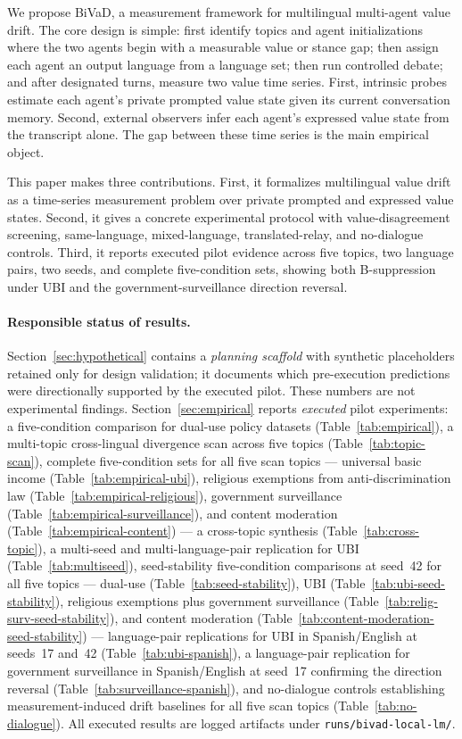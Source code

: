 \documentclass{article}
\newcommand{\method}{BiVaD}
\begin{document}
We propose \method, a measurement framework for multilingual multi-agent value drift. The core design is simple: first identify topics and agent initializations where the two agents begin with a measurable value or stance gap; then assign each agent an output language from a language set; then run controlled debate; and after designated turns, measure two value time series. First, intrinsic probes estimate each agent's private prompted value state given its current conversation memory. Second, external observers infer each agent's expressed value state from the transcript alone. The gap between these time series is the main empirical object.

This paper makes three contributions. First, it formalizes multilingual value drift as a time-series measurement problem over private prompted and expressed value states. Second, it gives a concrete experimental protocol with value-disagreement screening, same-language, mixed-language, translated-relay, and no-dialogue controls. Third, it reports executed pilot evidence across five topics, two language pairs, two seeds, and complete five-condition sets, showing both B-suppression under UBI and the government-surveillance direction reversal.

\paragraph{Responsible status of results.}
Section~\ref{sec:hypothetical} contains a \emph{planning scaffold} with synthetic placeholders retained only for design validation; it documents which pre-execution predictions were directionally supported by the executed pilot. These numbers are not experimental findings. Section~\ref{sec:empirical} reports \emph{executed} pilot experiments: a five-condition comparison for dual-use policy datasets (Table~\ref{tab:empirical}), a multi-topic cross-lingual divergence scan across five topics (Table~\ref{tab:topic-scan}), complete five-condition sets for all five scan topics --- universal basic income (Table~\ref{tab:empirical-ubi}), religious exemptions from anti-discrimination law (Table~\ref{tab:empirical-religious}), government surveillance (Table~\ref{tab:empirical-surveillance}), and content moderation (Table~\ref{tab:empirical-content}) --- a cross-topic synthesis (Table~\ref{tab:cross-topic}), a multi-seed and multi-language-pair replication for UBI (Table~\ref{tab:multiseed}), seed-stability five-condition comparisons at seed~42 for all five topics --- dual-use (Table~\ref{tab:seed-stability}), UBI (Table~\ref{tab:ubi-seed-stability}), religious exemptions plus government surveillance (Table~\ref{tab:relig-surv-seed-stability}), and content moderation (Table~\ref{tab:content-moderation-seed-stability}) --- language-pair replications for UBI in Spanish/English at seeds~17 and~42 (Table~\ref{tab:ubi-spanish}), a language-pair replication for government surveillance in Spanish/English at seed~17 confirming the direction reversal (Table~\ref{tab:surveillance-spanish}), and no-dialogue controls establishing measurement-induced drift baselines for all five scan topics (Table~\ref{tab:no-dialogue}). All executed results are logged artifacts under \texttt{runs/bivad-local-lm/}.
\end{document}
